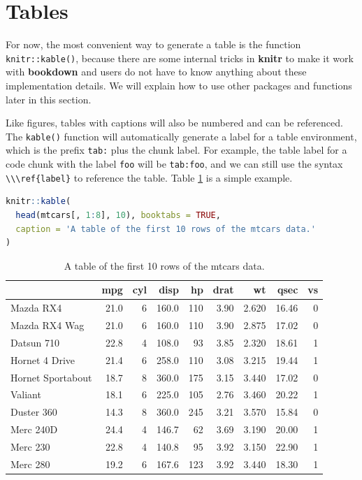 \documentclass[doctor,openright,twoside]{sjtuthesis}
\newcommand{\passthrough}[1]{#1}
\theoremstyle{plain}
\theoremstyle{definition}
\theoremstyle{remark}
\theoremstyle{ocrenumbox}
\theoremstyle{plain}
\begin{document}
\hypertarget{tables}{%
\section{Tables}\label{tables}}

For now, the most convenient way to generate a table is the function \passthrough{\lstinline!knitr::kable()!}, because there are some internal tricks in \textbf{knitr} to make it work with \textbf{bookdown} and users do not have to know anything about these implementation details. We will explain how to use other packages and functions later in this section.

Like figures, tables with captions will also be numbered and can be referenced. The \passthrough{\lstinline!kable()!} function will automatically generate a label for a table environment, which is the prefix \passthrough{\lstinline!tab:!} plus the chunk label. For example, the table label for a code chunk with the label \passthrough{\lstinline!foo!} will be \passthrough{\lstinline!tab:foo!}, and we can still use the syntax \passthrough{\lstinline!\\\ref{label}!} to reference the table. Table \ref{tab:table-single} is a simple example.

\begin{lstlisting}[language=R]
knitr::kable(
  head(mtcars[, 1:8], 10), booktabs = TRUE,
  caption = 'A table of the first 10 rows of the mtcars data.'
)
\end{lstlisting}

\begin{table}[t]

\caption{\label{tab:table-single}A table of the first 10 rows of the mtcars data.}
\centering
\begin{tabular}{lrrrrrrrr}
\toprule
  & mpg & cyl & disp & hp & drat & wt & qsec & vs\\
\midrule
Mazda RX4 & 21.0 & 6 & 160.0 & 110 & 3.90 & 2.620 & 16.46 & 0\\
Mazda RX4 Wag & 21.0 & 6 & 160.0 & 110 & 3.90 & 2.875 & 17.02 & 0\\
Datsun 710 & 22.8 & 4 & 108.0 & 93 & 3.85 & 2.320 & 18.61 & 1\\
Hornet 4 Drive & 21.4 & 6 & 258.0 & 110 & 3.08 & 3.215 & 19.44 & 1\\
Hornet Sportabout & 18.7 & 8 & 360.0 & 175 & 3.15 & 3.440 & 17.02 & 0\\
\addlinespace
Valiant & 18.1 & 6 & 225.0 & 105 & 2.76 & 3.460 & 20.22 & 1\\
Duster 360 & 14.3 & 8 & 360.0 & 245 & 3.21 & 3.570 & 15.84 & 0\\
Merc 240D & 24.4 & 4 & 146.7 & 62 & 3.69 & 3.190 & 20.00 & 1\\
Merc 230 & 22.8 & 4 & 140.8 & 95 & 3.92 & 3.150 & 22.90 & 1\\
Merc 280 & 19.2 & 6 & 167.6 & 123 & 3.92 & 3.440 & 18.30 & 1\\
\bottomrule
\end{tabular}
\end{table}
\end{document}
